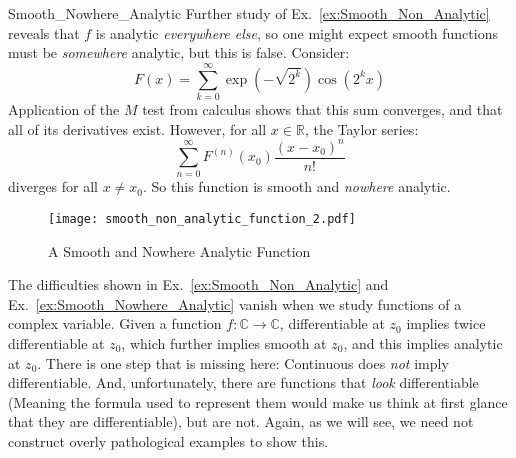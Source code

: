     \begin{lexample}{}{Smooth_Nowhere_Analytic}
        Further study of Ex.~\ref{ex:Smooth_Non_Analytic} reveals that
        $f$ is analytic \textit{everywhere else}, so one might expect
        smooth functions must be \textit{somewhere} analytic, but
        this is false. Consider:
        \begin{equation}
            F(x)=\sum_{k=0}^{\infty}\exp(\minus\sqrt{2^{k}})\cos(2^{k}x)
        \end{equation}
        Application of the $M$ test from calculus shows that this sum
        converges, and that all of its derivatives exist. However, for
        all $x\in\mathbb{R}$, the Taylor series:
        \begin{equation}
            \sum_{n=0}^{\infty}
                F^{(n)}(x_{0})\frac{(x-x_{0})^{n}}{n!}
        \end{equation}
        diverges for all $x\ne{x}_{0}$. So this function is smooth
        and \textit{nowhere} analytic.
    \end{lexample}
    \begin{figure}[H]
        \centering
        \texttt{[image: smooth\_non\_analytic\_function\_2.pdf]}
        \caption{A Smooth and Nowhere Analytic Function}
        \label{fig:Smooth_But_Non_Analytic}
    \end{figure}
    The difficulties shown in Ex.~\ref{ex:Smooth_Non_Analytic} and
    Ex.~\ref{ex:Smooth_Nowhere_Analytic} vanish when we study functions
    of a complex variable. Given a function
    $f:\mathbb{C}\rightarrow\mathbb{C}$, differentiable at $z_{0}$
    implies twice differentiable at $z_{0}$, which further implies
    smooth at $z_{0}$, and this implies analytic at $z_{0}$. There is
    one step that is missing here: Continuous does \textit{not} imply
    differentiable. And, unfortunately, there are functions that
    \textit{look} differentiable (Meaning the formula used to represent
    them would make us think at first glance that they are
    differentiable), but are not. Again, as we will see, we need not
    construct overly pathological examples to show this.
